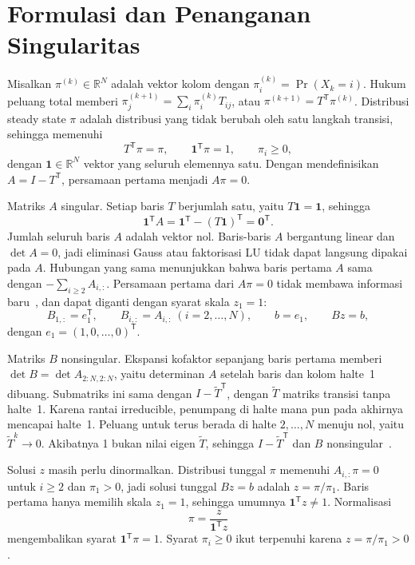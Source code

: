 \documentclass[12pt,a4paper]{article}
\newcommand{\R}{\mathbb{R}}
\newcommand{\T}{\mathsf{T}}
\numberwithin{equation}{section}
\begin{document}
\section{Formulasi dan Penanganan Singularitas}\label{sec:formulasi}
Misalkan $\pi^{(k)}\in\R^N$ adalah vektor kolom dengan $\pi^{(k)}_i=\Pr(X_k=i)$. Hukum peluang total memberi
$\pi^{(k+1)}_j=\sum_{i}\pi^{(k)}_i T_{ij}$, atau $\pi^{(k+1)}=T^\T\pi^{(k)}$. Distribusi steady state
$\pi$ adalah distribusi yang tidak berubah oleh satu langkah transisi, sehingga memenuhi
\begin{equation}\label{eq:steady}
T^\T\pi=\pi,\qquad \mathbf1^\T\pi=1,\qquad \pi_i\ge0,
\end{equation}
dengan $\mathbf1\in\R^N$ vektor yang seluruh elemennya satu. Dengan mendefinisikan $A=I-T^\T$, persamaan pertama
menjadi $A\pi=0$.

Matriks $A$ singular. Setiap baris $T$ berjumlah satu, yaitu $T\mathbf1=\mathbf1$, sehingga
\[
\mathbf1^\T A=\mathbf1^\T-(T\mathbf1)^\T=\mathbf0^\T .
\]
Jumlah seluruh baris $A$ adalah vektor nol. Baris-baris $A$ bergantung linear dan $\det A=0$, jadi eliminasi Gauss
atau faktorisasi LU tidak dapat langsung dipakai pada $A$. Hubungan yang sama menunjukkan bahwa baris pertama $A$
sama dengan $-\sum_{i\ge2}A_{i,:}$. Persamaan pertama dari $A\pi=0$ tidak membawa informasi baru~\cite{stewart}, dan
dapat diganti dengan syarat skala $z_1=1$:
\begin{equation}\label{eq:B}
B_{1,:}=e_1^\T,\qquad B_{i,:}=A_{i,:}\ (i=2,\dots,N),\qquad b=e_1,\qquad Bz=b,
\end{equation}
dengan $e_1=(1,0,\dots,0)^\T$.

Matriks $B$ nonsingular. Ekspansi kofaktor sepanjang baris pertama memberi $\det B=\det A_{2:N,2:N}$, yaitu
determinan $A$ setelah baris dan kolom halte~1 dibuang. Submatriks ini sama dengan $I-\widetilde T^\T$, dengan
$\widetilde T$ matriks transisi tanpa halte~1. Karena rantai irreducible, penumpang di halte mana pun pada akhirnya
mencapai halte~1. Peluang untuk terus berada di halte $2,\dots,N$ menuju nol, yaitu $\widetilde T^k\to0$. Akibatnya
1 bukan nilai eigen $\widetilde T$, sehingga $I-\widetilde T^\T$ dan $B$ nonsingular~\cite{stewart}.

Solusi $z$ masih perlu dinormalkan. Distribusi tunggal $\pi$ memenuhi $A_{i,:}\pi=0$ untuk $i\ge2$ dan $\pi_1>0$,
jadi solusi tunggal $Bz=b$ adalah $z=\pi/\pi_1$. Baris pertama hanya memilih skala $z_1=1$, sehingga umumnya
$\mathbf1^\T z\ne1$. Normalisasi
\begin{equation}\label{eq:normal}
\pi=\frac{z}{\mathbf1^\T z}
\end{equation}
mengembalikan syarat $\mathbf1^\T\pi=1$. Syarat $\pi_i\ge0$ ikut terpenuhi karena $z=\pi/\pi_1>0$.
\end{document}
